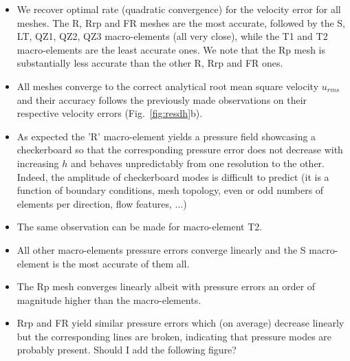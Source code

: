 \documentclass[a4paper,12pt]{article}
\begin{document}
\begin{itemize}

\item We recover optimal rate (quadratic convergence) for the velocity error for all meshes.
The R, Rrp and FR meshes are the most accurate, followed by the S, LT, QZ1, QZ2, QZ3 macro-elements
(all very close), while the T1 and T2 macro-elements are the least accurate ones. 
We note that the Rp mesh is substantially less accurate than the other R, Rrp and FR ones.

\item All meshes converge to the correct analytical root mean square velocity $u_{rms}$ and 
their accuracy follows the previously made observations on their respective velocity errors
(Fig.~\ref{fig:resdh}b).

\item As expected the 'R' macro-element yields a pressure field showcasing a checkerboard so that 
the corresponding pressure error does not decrease with increasing $h$ and behaves unpredictably
from one resolution to the other. Indeed, the amplitude of checkerboard modes is difficult to predict (it is a function 
of boundary conditions, mesh topology, even or odd numbers of elements per direction, flow features, ...) 
\item The same observation can be made for macro-element T2. 
\item All other macro-elements pressure errors converge linearly and the S macro-element is
the most accurate of them all.
\item The Rp mesh converges linearly albeit with pressure errors an order of magnitude higher than 
the macro-elements.
\item Rrp and FR yield similar pressure errors which (on average) decrease linearly but the corresponding 
lines are broken, indicating that pressure modes are probably present. 
{\color{red} Should I add the following figure?}


\end{itemize}
\end{document}
